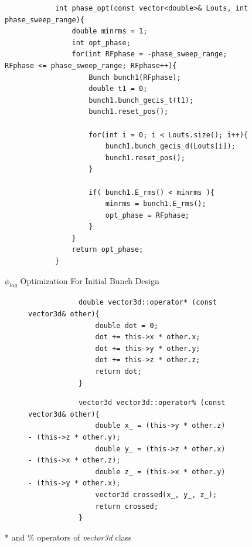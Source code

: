 \documentclass{book}
\begin{document}
\begin{figure}[H]
        \centering
        \captionsetup{justification=centering}
        \begin{verbatim}
            int phase_opt(const vector<double>& Louts, int phase_sweep_range){
                double minrms = 1;
                int opt_phase;
                for(int RFphase = -phase_sweep_range; RFphase <= phase_sweep_range; RFphase++){
                    Bunch bunch1(RFphase);
                    double t1 = 0;
                    bunch1.bunch_gecis_t(t1);
                    bunch1.reset_pos();
            
                    for(int i = 0; i < Louts.size(); i++){
                        bunch1.bunch_gecis_d(Louts[i]);
                        bunch1.reset_pos();
                    }
                        
                    if( bunch1.E_rms() < minrms ){
                        minrms = bunch1.E_rms();
                        opt_phase = RFphase;
                    }
                }
                return opt_phase;
            }
        \end{verbatim}
    \caption{$\phi_{lag}$ Optimization For Initial Bunch Design}
    \label{fig:phlag_opt_n_pass}
\end{figure}

\begin{figure}[H]
    \captionsetup[subfigure]{justification=centering}
    \captionsetup{justification=centering}
    \begin{subfigure}{\textwidth}
        \begin{verbatim}
            double vector3d::operator* (const vector3d& other){
                double dot = 0;
                dot += this->x * other.x;
                dot += this->y * other.y;
                dot += this->z * other.z;
                return dot;
            }
        \end{verbatim}
    \end{subfigure}

    \begin{subfigure}{\textwidth}
        \begin{verbatim}
            vector3d vector3d::operator% (const vector3d& other){
                double x_ = (this->y * other.z) - (this->z * other.y);
                double y_ = (this->z * other.x) - (this->x * other.z);
                double z_ = (this->x * other.y) - (this->y * other.x);
                vector3d crossed(x_, y_, z_);
                return crossed;
            }
        \end{verbatim}
    \end{subfigure}
    \caption{* and \% operators of \textit{vector3d} class}
    \label{fig:vector3d_dot_cross_product}
\end{figure}
\end{document}
